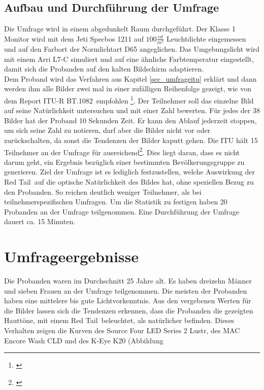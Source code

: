 \section{Aufbau und Durchführung der Umfrage} 
Die Umfrage wird in einem abgedunkelt Raum durchgeführt. Der Klasse 1 Monitor wird mit dem Jeti Specbos 1211 auf $100\frac{cd}{m^{2}}$ Leuchtdichte eingemessen und auf den Farbort der Normlichtart D65 angeglichen. Das Umgebungslicht wird mit einem Arri L7-C simuliert und  auf eine ähnliche Farbtemperatur eingestellt, damit sich die Probanden auf den kalten Bildschirm adaptieren.\\
Dem Proband wird das Verfahren aus Kapitel \ref{sec_umfrageitu}  erklärt und dann werden ihm alle Bilder zwei mal in einer zufälligen Reihenfolge gezeigt, wie von dem \glqq Report ITU-R BT.1082\grqq\ empfohlen \footnote{\cite[368]{itu90}}. Der Teilnehmer soll das einzelne Bild auf seine Natürlichkeit untersuchen und mit einer Zahl bewerten. Für jedes der 38 Bilder hat der Proband 10 Sekunden Zeit. Er kann den Ablauf jederzeit stoppen, um sich seine Zahl zu notieren, darf aber die Bilder nicht vor oder zurückschalten, da sonst die Tendenzen der Bilder kaputt gehen. Die ITU hält 15 Teilnehmer an der Umfrage für ausreichend\footnote{\cite[368]{itu90}}. Dies liegt daran, dass es nicht darum geht, ein Ergebnis bezüglich einer bestimmten Bevölkerungsgruppe zu generieren. Ziel der Umfrage ist es lediglich festzustellen, welche Auswirkung der \glqq Red Tail\grqq\ auf die optische Natürlichkeit des Bildes hat, ohne speziellen Bezug zu den Probanden. So reichen deutlich weniger Teilnehmer, als bei teilnehmerspezifischen Umfragen. Um die Statistik zu festigen haben 20 Probanden an der Umfrage teilgenommen. Eine Durchführung der Umfrage dauert ca. 15 Minuten.


\chapter{Umfrageergebnisse}
Die Probanden waren im Durchschnitt 25 Jahre alt. Es haben dreizehn Männer und sieben Frauen an der Umfrage teilgenommen. Die meisten der Probanden haben eine mittelere bis gute Lichtvorkenntnis. 
Aus den vergebenen Werten für die Bilder lassen sich die Tendenzen erkennen, dass die Probanden die gezeigten Hauttöne, mit einem \glqq Red Tail\grqq\ beleuchtet, als natürlicher befinden. Dieses Verhalten zeigen die Kurven des Source Four LED Series 2 Lustr, des MAC Encore Wash CLD und des K-Eye K20 (Abbildung %



